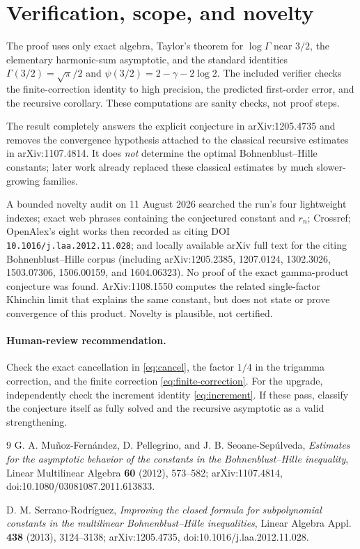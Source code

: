 \documentclass[11pt]{article}
\begin{document}
\section{Verification, scope, and novelty}

The proof uses only exact algebra, Taylor's theorem for $\log\Gamma$ near
$3/2$, the elementary harmonic-sum asymptotic, and the standard identities
$\Gamma(3/2)=\sqrt\pi/2$ and
$\psi(3/2)=2-\gamma-2\log2$.  The included verifier checks the finite-correction
identity to high precision, the predicted first-order error, and the recursive
corollary.  These computations are sanity checks, not proof steps.

The result completely answers the explicit conjecture in arXiv:1205.4735 and
removes the convergence hypothesis attached to the classical recursive
estimates in arXiv:1107.4814.  It does \emph{not} determine the optimal
Bohnenblust--Hille constants; later work already replaced these classical
estimates by much slower-growing families.

A bounded novelty audit on 11 August 2026 searched the run's four lightweight
indexes; exact web phrases containing the conjectured constant and $r_n$;
Crossref; OpenAlex's eight works then recorded as citing DOI
\texttt{10.1016/j.laa.2012.11.028}; and locally available arXiv full text for
the citing Bohnenblust--Hille corpus (including arXiv:1205.2385, 1207.0124,
1302.3026, 1503.07306, 1506.00159, and 1604.06323).  No proof of the exact
gamma-product conjecture was found.  ArXiv:1108.1550 computes the related
single-factor Khinchin limit that explains the same constant, but does not
state or prove convergence of this product.  Novelty is plausible, not
certified.

\paragraph{Human-review recommendation.}
Check the exact cancellation in \eqref{eq:cancel}, the factor $1/4$ in the
trigamma correction, and the finite correction \eqref{eq:finite-correction}.
For the upgrade, independently check the increment identity
\eqref{eq:increment}.  If these pass, classify the conjecture itself as fully
solved and the recursive asymptotic as a valid strengthening.

\begin{thebibliography}{9}
G. A. Mu\~noz-Fern\'andez, D. Pellegrino, and J. B. Seoane-Sep\'ulveda,
\emph{Estimates for the asymptotic behavior of the constants in the
Bohnenblust--Hille inequality}, Linear Multilinear Algebra \textbf{60} (2012),
573--582; arXiv:1107.4814, doi:10.1080/03081087.2011.613833.

D. M. Serrano-Rodr\'iguez,
\emph{Improving the closed formula for subpolynomial constants in the
multilinear Bohnenblust--Hille inequalities}, Linear Algebra Appl.
\textbf{438} (2013), 3124--3138; arXiv:1205.4735,
doi:10.1016/j.laa.2012.11.028.
\end{thebibliography}
\end{document}
